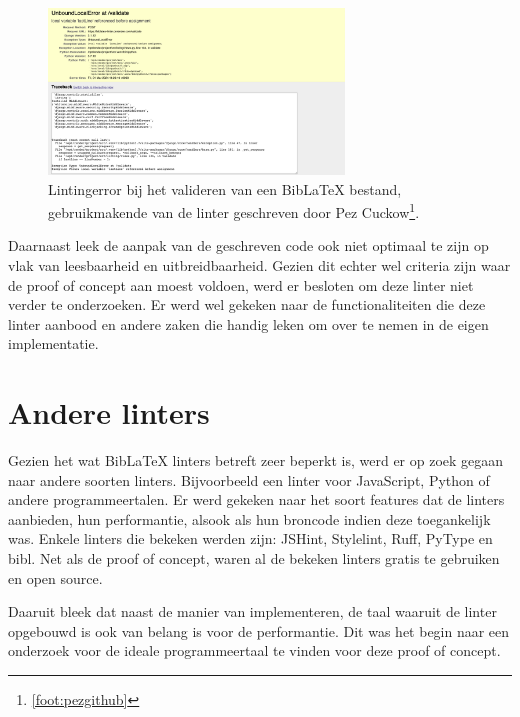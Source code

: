 \begin{figure}[ht]
    \centering
    \includegraphics[width=0.7\textwidth]{./files/Pezmc-LinterError_cropped.png}
    \caption[Foutmelding BibLaTeX-linter]{Lintingerror bij het valideren van een BibLaTeX bestand, gebruikmakende van de linter geschreven door Pez Cuckow\footnote[1]{\ref{foot:pezgithub}}.}
    \label{fig:biblatex-linter-error}
\end{figure}

Daarnaast leek de aanpak van de geschreven code ook niet optimaal te zijn op vlak van leesbaarheid en uitbreidbaarheid. Gezien dit echter wel criteria zijn waar de proof of concept aan moest voldoen, werd er besloten om deze linter niet verder te onderzoeken. Er werd wel gekeken naar de functionaliteiten die deze linter aanbood en andere zaken die handig leken om over te nemen in de eigen implementatie.

\section{Andere linters}
Gezien het wat BibLaTeX linters betreft zeer beperkt is, werd er op zoek gegaan naar andere soorten linters. Bijvoorbeeld een linter voor JavaScript, Python of andere programmeertalen. Er werd gekeken naar het soort features dat de linters aanbieden, hun performantie, alsook als hun broncode indien deze toegankelijk was. Enkele linters die bekeken werden zijn: JSHint, Stylelint, Ruff, PyType en bibl. Net als de proof of concept, waren al de bekeken linters gratis te gebruiken en open source.

Daaruit bleek dat naast de manier van implementeren, de taal waaruit de linter opgebouwd is ook van belang is voor de performantie. Dit was het begin naar een onderzoek voor de ideale programmeertaal te vinden voor deze proof of concept. 

